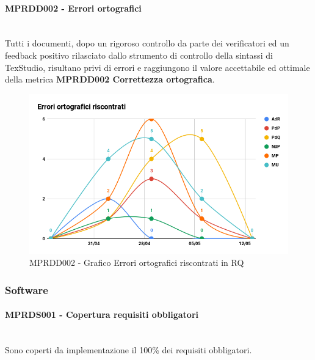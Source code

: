 \paragraph{MPRDD002 - Errori ortografici}\mbox{}\\[0.4cm]
Tutti i documenti, dopo un rigoroso controllo da parte dei verificatori ed un feedback positivo rilasciato dallo strumento di controllo della sintassi di TexStudio, risultano privi di errori e raggiungono il valore accettabile ed ottimale della metrica  \textbf{MPRDD002 Correttezza ortografica}.
\begin{figure}[H]
	\centering
	\includegraphics[width=13cm,keepaspectratio]{../includes/pics/ErroriRA.png}
	\caption{\label{fig:mission}MPRDD002 - Grafico Errori ortografici riscontrati in RQ}
\end{figure}
\clearpage
\subsubsection{Software}
\paragraph{MPRDS001 - Copertura requisiti obbligatori}\mbox{}\\[0.4cm]
Sono coperti da implementazione il 100\% dei requisiti obbligatori.
